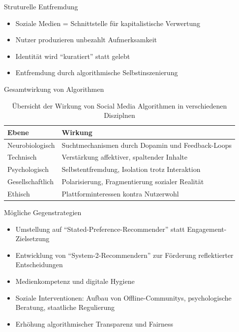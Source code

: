\begin{frame}{Struturelle Entfremdung~\cite{rey_alienation_2012}}
    \begin{itemize}
        \item Soziale Medien = Schnittstelle für kapitalistische Verwertung
        \item Nutzer produzieren unbezahlt Aufmerksamkeit
        \item Identität wird \enquote{kuratiert} statt gelebt
        \item Entfremdung durch algorithmische Selbstinszenierung
    \end{itemize}
\end{frame}
\begin{frame}{Gesamtwirkung von Algorithmen}
    \begin{table}
        \begin{tabular}{@{}p{3.5cm}p{6.5cm}@{}}
            \toprule
            \textbf{Ebene} & \textbf{Wirkung} \\
            \midrule
            Neurobiologisch & Suchtmechanismen durch Dopamin und Feedback-Loops \\
            Technisch & Verstärkung affektiver, spaltender Inhalte \\
            Psychologisch & Selbstentfremdung, Isolation trotz Interaktion \\
            Gesellschaftlich & Polarisierung, Fragmentierung sozialer Realität \\
            Ethisch & Plattforminteressen kontra Nutzerwohl \\
            \bottomrule
        \end{tabular}
        \caption{Übersicht der Wirkung von Social Media Algorithmen in verschiedenen Disziplnen}
        \label{tab:fazit}
    \end{table}
\end{frame}

\begin{frame}{Mögliche Gegenstrategien}
    \begin{itemize}
        \item Umstellung auf \enquote{Stated-Preference-Recommender} statt Engagement-Zielsetzung~\cite{milli_engagement_2024}
        \item Entwicklung von \enquote{System-2-Recommendern} zur Förderung reflektierter Entscheidungen~\cite{milli_engagement_2024}
        \item Medienkompetenz und digitale Hygiene~\cite{santini_social_2024}
        \item Soziale Interventionen: Aufbau von Offline-Communitys, psychologische Beratung, staatliche Regulierung~\cite{siddiq_social_2024}
        \item Erhöhung algorithmischer Transparenz und Fairness
    \end{itemize}
\end{frame}